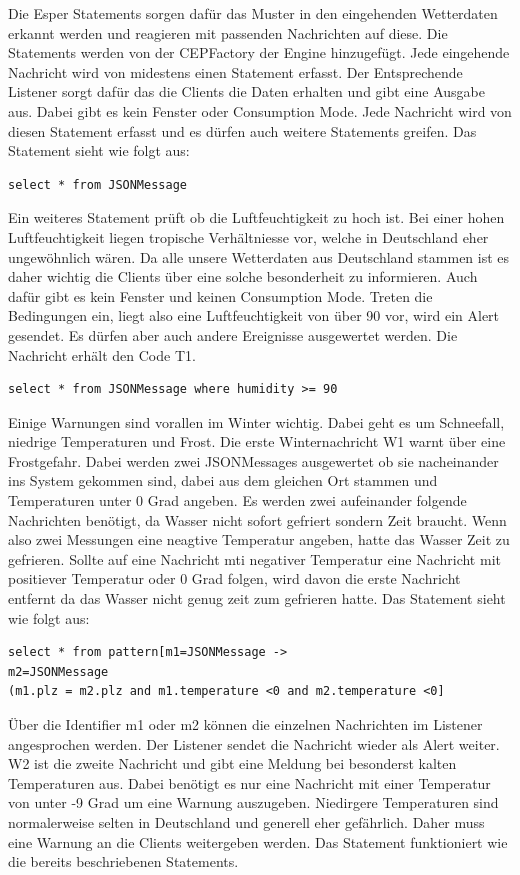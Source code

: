 Die Esper Statements sorgen dafür das Muster in den eingehenden Wetterdaten erkannt werden und reagieren mit passenden Nachrichten auf diese. Die Statements werden von der CEPFactory der Engine hinzugefügt. Jede eingehende Nachricht wird von midestens einen Statement erfasst. Der Entsprechende Listener sorgt dafür das die Clients die Daten erhalten und gibt eine Ausgabe aus. Dabei gibt es kein Fenster oder Consumption Mode. Jede Nachricht wird von diesen Statement erfasst und es dürfen auch weitere Statements greifen. Das Statement sieht wie folgt aus: 
\begin{lstlisting}
select * from JSONMessage
\end{lstlisting}
Ein weiteres Statement prüft ob die Luftfeuchtigkeit zu hoch ist. Bei einer hohen Luftfeuchtigkeit liegen tropische Verhältniesse vor, welche in Deutschland eher ungewöhnlich wären. Da alle unsere Wetterdaten aus Deutschland stammen ist es daher wichtig die Clients über eine solche besonderheit zu informieren. Auch dafür gibt es kein Fenster und keinen Consumption Mode. Treten die Bedingungen ein, liegt also eine Luftfeuchtigkeit von über 90 vor, wird ein Alert gesendet. Es dürfen aber auch andere Ereignisse ausgewertet werden.  Die Nachricht erhält den Code T1. 
\begin{lstlisting}
select * from JSONMessage where humidity >= 90
\end{lstlisting}
Einige Warnungen sind vorallen im Winter wichtig. Dabei geht es um Schneefall, niedrige Temperaturen und Frost. Die erste Winternachricht W1 warnt über eine Frostgefahr. Dabei werden zwei JSONMessages ausgewertet ob sie nacheinander ins System gekommen sind, dabei aus dem gleichen Ort stammen und Temperaturen unter 0 Grad angeben. Es werden zwei aufeinander folgende Nachrichten benötigt, da Wasser nicht sofort gefriert sondern Zeit braucht. Wenn also zwei Messungen eine neagtive Temperatur angeben, hatte das Wasser Zeit zu gefrieren. Sollte auf eine Nachricht mti negativer Temperatur eine Nachricht mit positiever Temperatur oder 0 Grad folgen, wird davon die erste Nachricht entfernt da das Wasser nicht genug zeit zum gefrieren hatte. Das Statement sieht wie folgt aus: 
\begin{lstlisting}
select * from pattern[m1=JSONMessage ->
m2=JSONMessage
(m1.plz = m2.plz and m1.temperature <0 and m2.temperature <0]
\end{lstlisting}
Über die Identifier m1 oder m2 können die einzelnen Nachrichten im Listener angesprochen werden. Der Listener sendet die Nachricht wieder als Alert weiter. W2 ist die zweite Nachricht und gibt eine Meldung bei besonderst kalten Temperaturen aus. Dabei benötigt es nur eine Nachricht mit einer Temperatur von unter -9 Grad um eine Warnung auszugeben. Niedirgere Temperaturen sind normalerweise selten in Deutschland und generell eher gefährlich. Daher muss eine Warnung an die Clients weitergeben werden. Das Statement funktioniert wie die bereits beschriebenen Statements. 
